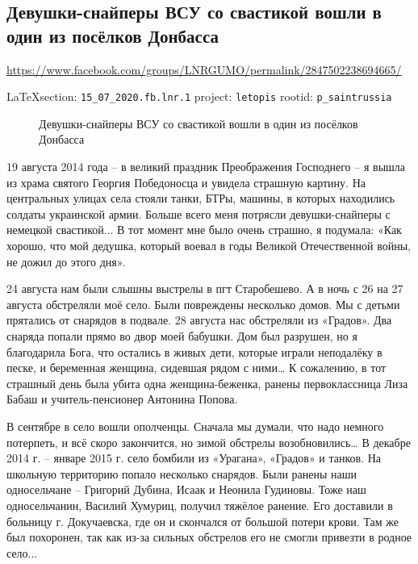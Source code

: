  
 
  
\subsection{Девушки-снайперы ВСУ со свастикой вошли в один из посёлков Донбасса}
\url{https://www.facebook.com/groups/LNRGUMO/permalink/2847502238694665/}

\vspace{0.5cm}
{\small\LaTeX section: \verb|15_07_2020.fb.lnr.1| project: \verb|letopis| rootid: \verb|p_saintrussia|}
\vspace{0.5cm}

\begin{figure}[ht]
 \centering
 \caption{Девушки-снайперы ВСУ со свастикой вошли в один из посёлков Донбасса}
 \label{fig:}
\end{figure}

19 августа 2014 года – в великий праздник Преображения Господнего – я вышла из
храма святого Георгия Победоносца и увидела страшную картину. На центральных
улицах села стояли танки, БТРы, машины, в которых находились солдаты украинской
армии. Больше всего меня потрясли девушки-снайперы с немецкой свастикой... В
тот момент мне было очень страшно, я подумала: «Как хорошо, что мой дедушка,
который воевал в годы Великой Отечественной войны, не дожил до этого дня».

24 августа нам были слышны выстрелы в пгт Старобешево. А в ночь с 26 на 27
августа обстреляли моё село. Были повреждены несколько домов. Мы с детьми
прятались от снарядов в подвале. 28 августа нас обстреляли из «Градов». Два
снаряда попали прямо во двор моей бабушки. Дом был разрушен, но я благодарила
Бога, что остались в живых дети, которые играли неподалёку в песке, и
беременная женщина, сидевшая рядом с ними… К сожалению, в тот страшный день
была убита одна женщина-беженка, ранены первоклассница Лиза Бабаш и
учитель-пенсионер Антонина Попова.

В сентябре в село вошли ополченцы. Сначала мы думали, что надо немного
потерпеть, и всё скоро закончится, но зимой обстрелы возобновились… В декабре
2014 г. – январе 2015 г. село бомбили из «Урагана», «Градов» и танков. На
школьную территорию попало несколько снарядов. Были ранены наши односельчане –
Григорий Дубина, Исаак и Неонила Гудиновы. Тоже наш односельчанин, Василий
Хумуриц, получил тяжёлое ранение. Его доставили в больницу г. Докучаевска, где
он и скончался от большой потери крови. Там же был похоронен, так как из-за
сильных обстрелов его не смогли привезти в родное село...

